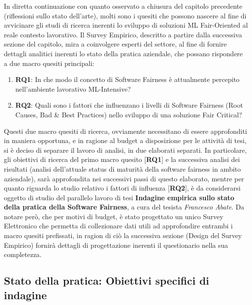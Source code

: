     In diretta continuazione con quanto osservato a chiusura del capitolo precedente (riflessioni sullo stato dell'arte), molti sono i quesiti che possono nascere al fine di avvicinare gli studi di ricerca inerenti lo sviluppo di soluzioni ML Fair-Oriented al reale contesto lavorativo. Il Survey Empirico, descritto a partire dalla successiva sezione del capitolo, mira a coinvolgere esperti del settore, al fine di fornire dettagli analitici inerenti lo stato della pratica aziendale, che possano rispondere a due macro quesiti principali:
    
    \begin{enumerate}
		\item \textbf{RQ1}: In che modo il concetto di Software Fairness è attualmente percepito nell'ambiente lavorativo ML-Intensive?
		\item \textbf{RQ2}: Quali sono i fattori che influenzano i livelli di Software Fairness (Root Causes, Bad \& Best Practices) nello sviluppo di una soluzione Fair Critical?
    \end{enumerate}  

	Questi due macro quesiti di ricerca, ovviamente necessitano di essere approfonditi in maniera opportuna, e in ragione al budget a disposizione per le attività di tesi, si è deciso di separare il lavoro di analisi, in due elaborati separati. In particolare, gli obiettivi di ricerca del primo macro quesito [\textbf{RQ1}] e la successiva analisi dei risultati (analisi dell'attuale status di maturità della software fairness in ambito aziendale), sarà approfondita nei successivi passi di questo elaborato, mentre per quanto riguarda lo studio relativo i fattori di influenza [\textbf{RQ2}], è da considerarsi oggetto di studio del parallelo lavoro di tesi \textbf{Indagine empirica sullo stato della pratica della Software Fairness}, a cura del tesista \emph{Francesco Abate}. Da notare però, che per motivi di budget, è stato progettato un unico Survey Elettronico che permetta di collezionare dati utili ad approfondire entrambi i macro quesiti prefissati, in ragion di ciò la successiva sezione (Design del Survey Empirico) fornirà dettagli di progettazione inerenti il questionario nella sua completezza.
	
	\subsection{Stato della pratica: Obiettivi specifici di indagine}
	
